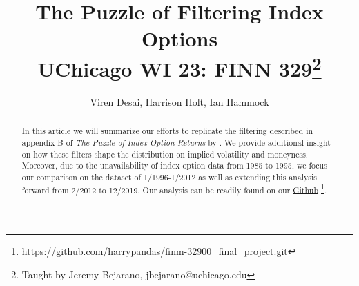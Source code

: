 \newcommand*{\MyHeaderPath}{.}%
\newcommand*{\PathToAssets}{../assets}%
\newcommand*{\PathToOutput}{../output}%
\newcommand*{\PathToBibFile}{bibliography.bib}%








\title{
The Puzzle of Filtering Index Options
\\{\color{blue} \large UChicago WI 23: FINN 329\footnote{Taught by Jeremy Bejarano, jbejarano@uchicago.edu }}
}

\author{
Viren Desai, Harrison Holt, Ian Hammock 
}
\begin{titlepage}
% 
\maketitle


\doublespacing
\begin{abstract}
In this article we will summarize our efforts to replicate the filtering described in appendix B of \textit{The Puzzle of Index Option Returns} by \citet{constantinides2013}. We provide additional insight on how these filters shape the distribution on implied volatility and moneyness. Moreover, due to the unavailability of index option data from 1985 to 1995, we focus our comparison on the dataset of 1/1996-1/2012 as well as extending this analysis forward from 2/2012 to 12/2019. Our analysis can be readily found on our \href{https://github.com/harrypandas/finm-32900_final_project.git}{Github} \footnote{ \url{https://github.com/harrypandas/finm-32900_final_project.git} }.  


\end{abstract}


\end{titlepage}


